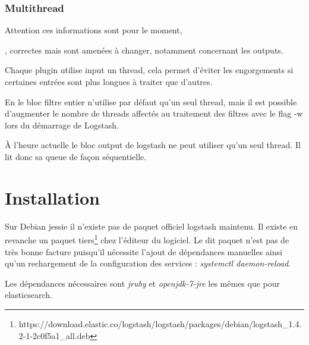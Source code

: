 \subsubsection{Multithread}
Attention ces informations sont pour le moment, \date{Jeudi 16 Avril}, correctes 
mais sont amenées à changer, notamment concernant les outputs.

Chaque plugin utilise input un \gls{thread}, cela permet d'éviter les engorgements si  
certaines entrées sont plus longues à traiter que d'autres.

En le bloc filtre entier n'utilise par défaut qu'un seul thread, mais il est possible 
d'augmenter le nombre de threads affectés au traitement des filtres avec le \gls{flag}
-w lors du démarrage de Logstash.

À l'heure actuelle le bloc output de logstash ne peut utiliser qu'un seul thread.
Il lit donc sa queue de façon séquentielle.


\section{Installation}
%
%
%
%
%
%
%
%
%
%
%
%




Sur Debian jessie il n'existe pas de paquet officiel logstash maintenu. Il existe 
en revanche un paquet tiers\footnote{https://download.elastic.co/logstash/logstash/packages/debian/logstash\_1.4.2-1-2c0f5a1\_all.deb} 
chez l'éditeur du logiciel. Le dit paquet n'est pas de très bonne facture  puisqu'il 
nécessite l'ajout de dépendances manuelles ainsi qu'un rechargement de la configuration 
des services : \emph{systemctl daemon-reload}.



Les dépendances nécessaires sont \emph{jruby} et \emph{openjdk-7-jre} les mêmes 
que pour elasticsearch.

